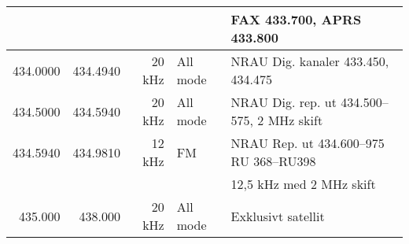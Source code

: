 {\begin{tabular}{rrrll}
	                  &          &             &                 & FAX 433.700, APRS 433.800                         \\ \hline
	         434.0000 & 434.4940 &      20 kHz & All mode        & NRAU Dig. kanaler 433.450, 434.475                \\ \hline
	         434.5000 & 434.5940 &      20 kHz & All mode        & NRAU Dig. rep. ut 434.500--575, 2 MHz skift       \\ \hline
	         434.5940 & 434.9810 &      12 kHz & FM              & NRAU Rep. ut 434.600--975 RU 368--RU398           \\
	                  &          &             &                 & 12,5 kHz med 2 MHz skift                          \\ \hline
	          435.000 &  438.000 &      20 kHz & All mode        & Exklusivt satellit
\end{tabular}}

